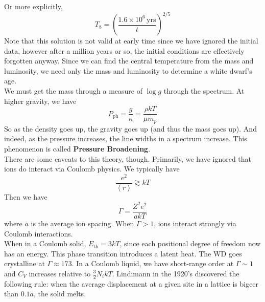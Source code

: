 \documentclass[10pt]{article}
\numberwithin{equation}{section}
\newcommand{\n}{\noindent}
\newcommand{\avg}[1]{\left\langle#1\right\rangle}
\begin{document}
    Or more explicitly,
    \begin{equation}
      \label{eq:303}
      T_8=\left(\frac{1.6\times 10^6\,\mathrm{yrs}}{t}\right)^{2/5}
    \end{equation}
    Note that this solution is not valid at early time since we have
    ignored the initial data, however after a million years or so, the
    initial conditions are effectively forgotten anyway. Since we can
    find the central temperature from the mass and luminosity, we need
    only the mass and luminosity to determine a white dwarf's age.\\

    \n We must get the mass through a measure of $\log g$ through the
    spectrum. At higher gravity, we have
    \begin{equation}
      P_{\mathrm{ph}}=\frac{g}{\kappa}=\frac{\rho kT}{\mu m_p}\label{eq:
304}
    \end{equation}
    So as the density goes up, the gravity goes up (and thus the mass
    goes up). And indeed, as the
    pressure increases, the line widths in a spectrum increase. This
    phenomenon is called \textbf{Pressure Broadening}. \\

    \n There are some caveats to this theory, though. Primarily, we
    have ignored that ions do interact via Coulomb physics. We
    typically have 
    \begin{equation}
      \label{eq:305}
      \frac{e^2}{\avg{r}}\gtrsim kT
    \end{equation}
    Then we have
    \begin{equation}
      \label{eq:306}
      \Gamma = \frac{Z^2 e^2}{a kT}
    \end{equation}
    where $a$ is the average ion spacing. When $\Gamma>1$, ions
    interact strongly via Coulomb interactions. \\

    \n When in a Coulomb solid, $E_{\mathrm{th}}=3kT$, since each
    positional degree of freedom now has an energy. This phase
    transition introduces a latent heat. The WD goes crystalline at
    $\Gamma\approx 173$. In a Coulomb liquid, we have short-range
    order at $\Gamma\sim1$ and $C_V$ increases relative to
    $\frac{3}{2}N_i kT$. Lindimann in the 1920's discovered the
    following rule: when the average displacement at a given site in a
    lattice is bigeer than $0.1a$, the solid melts.\\
\end{document}

